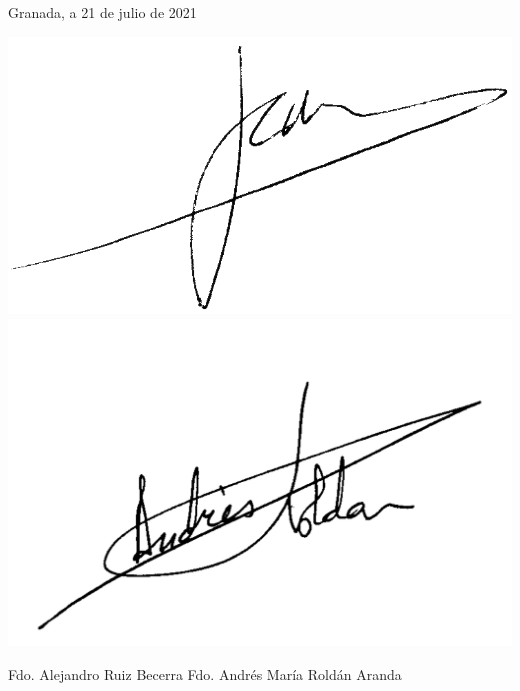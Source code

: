 \vspace*{1cm}

\begin{center}
Granada, a 21 de julio de 2021
\par\end{center}

\bigskip
\bigskip

\begin{center}
\hspace{0cm}\includegraphics[scale=0.9]{imagenes/firmaAlumno.png}\hspace{3cm} \includegraphics[scale=0.2]{imagenes/firmaTutor.png}
\end{center}

\begin{doublespace}
\begin{center}
\hspace{0cm}Fdo. Alejandro Ruiz Becerra \hspace{3cm} Fdo. Andrés María Roldán Aranda
\end{center}
\end{doublespace}
~

